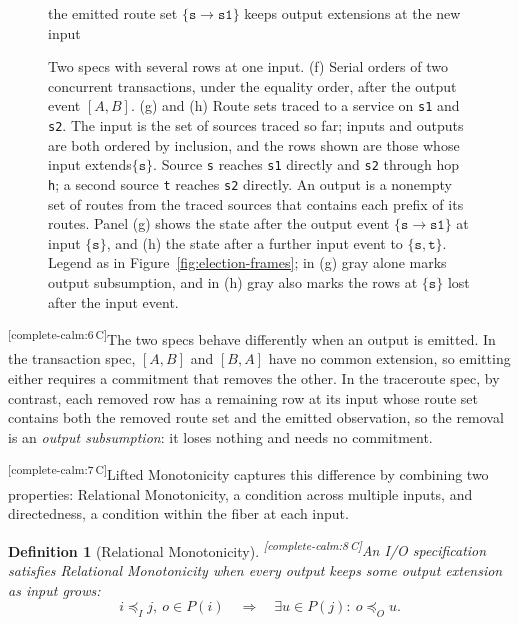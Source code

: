 \documentclass[sigconf]{cidr-2027}
\newtheorem{definition}{Definition}
\theoremstyle{remark}
\newcommand{\InputOrd}{\preceq_I}
\newcommand{\OutputOrd}{\preceq_O}
\newcommand{\commitment}{commitment\xspace}
\newcommand{\inrel}{extends\xspace}          %
\newcommand{\ingrows}{grows\xspace}          %
\newcommand{\outnoun}{output extension\xspace}%
\newcommand{\outnouns}{output extensions\xspace}
\newcommand{\spectype}[1][]{I/O specification#1\xspace}
\newcommand{\fiber}[1]{P(#1)}
\newcommand{\cxtag}[2]{\textsuperscript{\textsf{\tiny[#1\,#2]}}}
\begin{document}
\begin{figure}[t]
\begin{minipage}[t]{0.405\textwidth}
    {\footnotesize the emitted route set $\{\texttt{s}{\to}\texttt{s1}\}$ keeps \outnouns at the new input}
  \end{minipage}
  \caption{Two specs with several rows at one input.  (f) Serial orders of two
  concurrent transactions, under the equality order, after the output event
  $[A,B]$.  (g) and (h) Route sets traced to a service on \texttt{s1} and
  \texttt{s2}.  The input is the set of sources traced so far; inputs and
  outputs are both ordered by inclusion, and the rows shown are those whose
  input \inrel $\{\texttt{s}\}$.  Source \texttt{s} reaches \texttt{s1} directly and
  \texttt{s2} through hop \texttt{h}; a second source \texttt{t} reaches
  \texttt{s2} directly.  An output is a nonempty set of routes from the traced
  sources that contains each prefix of its routes.  Panel (g) shows the state
  after the output event $\{\texttt{s}{\to}\texttt{s1}\}$ at input
  $\{\texttt{s}\}$, and (h) the state after a further input event to
  $\{\texttt{s},\texttt{t}\}$.  Legend as in Figure~\ref{fig:election-frames};
  in (g) gray alone marks output subsumption, and in (h) gray also marks the
  rows at $\{\texttt{s}\}$ lost after the input event.}
  \label{fig:ambiguity-frames}
\end{figure}

\color{black!45}\cxtag{complete-calm:6}{C}The two specs behave differently when an output is emitted.  In the transaction
spec, $[A,B]$ and $[B,A]$ have no common extension, so emitting either requires a
\commitment that removes the other.  In the traceroute spec, by contrast, each
removed row has a remaining row at its input whose route set contains both the
removed route set and the emitted observation, so the removal is an
\emph{output subsumption}: it loses nothing and needs no \commitment.\color{black}

\color{black!45}\cxtag{complete-calm:7}{C}Lifted Monotonicity captures this difference by combining two properties:
Relational Monotonicity, a condition across multiple inputs, and directedness,
a condition within the fiber at each input.\color{black}

\label{sec:lifted-monotonicity}
\color{black!45}\begin{definition}[Relational Monotonicity]
\label{def:relational-monotonicity}
\cxtag{complete-calm:8}{C}An \spectype satisfies \emph{Relational Monotonicity}
when every output keeps some \outnoun as input \ingrows:
        \color{black}\begin{equation}
  i\InputOrd j,\ o\in\fiber{i}
  \quad\Longrightarrow\quad
  \exists u\in\fiber{j}:\ o\OutputOrd u.
  \label{eq:relational-monotonicity}
        \end{equation}
\end{definition}
\end{document}
